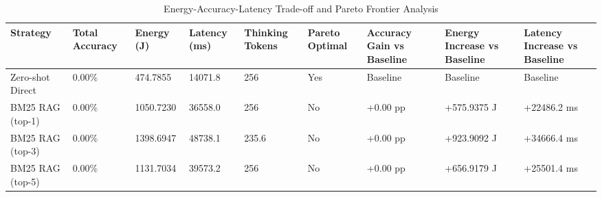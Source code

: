 \begin{table}
\caption{Energy-Accuracy-Latency Trade-off and Pareto Frontier Analysis}
\label{tab:tradeoff_comparison}
\begin{tabular}{lllllllll}
\toprule
Strategy & Total Accuracy & Energy (J) & Latency (ms) & Thinking Tokens & Pareto Optimal & Accuracy Gain vs Baseline & Energy Increase vs Baseline & Latency Increase vs Baseline \\
\midrule
Zero-shot Direct & 0.00\% & 474.7855 & 14071.8 & 256 & Yes & Baseline & Baseline & Baseline \\
BM25 RAG (top-1) & 0.00\% & 1050.7230 & 36558.0 & 256 & No & +0.00 pp & +575.9375 J & +22486.2 ms \\
BM25 RAG (top-3) & 0.00\% & 1398.6947 & 48738.1 & 235.6 & No & +0.00 pp & +923.9092 J & +34666.4 ms \\
BM25 RAG (top-5) & 0.00\% & 1131.7034 & 39573.2 & 256 & No & +0.00 pp & +656.9179 J & +25501.4 ms \\
\bottomrule
\end{tabular}
\end{table}
